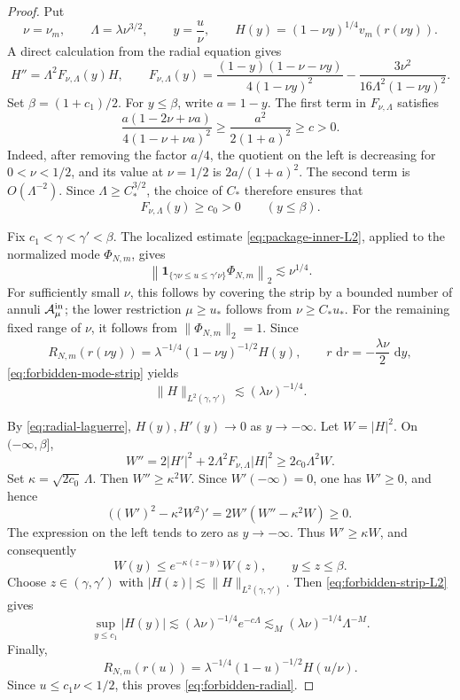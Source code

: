 \documentclass[11pt,a4paper]{amsart}
\numberwithin{equation}{section}
\newcommand{\one}{\mathbf 1}
\newcommand{\dd}{\,\mathrm d}
\newcommand{\norm}[1]{\lVert #1\rVert}
\begin{document}
\begin{proof}
Put
\[
 \nu=\nu_m,\qquad \Lambda=\lambda\nu^{3/2},\qquad y=\frac u\nu,
 \qquad H(y)=(1-\nu y)^{1/4}v_m(r(\nu y)).
\]
A direct calculation from the radial equation gives
\[
 H''=\Lambda^2F_{\nu,\Lambda}(y)H,
 \qquad
 F_{\nu,\Lambda}(y)
 =\frac{(1-y)(1-\nu-\nu y)}{4(1-\nu y)^2}
 -\frac{3\nu^2}{16\Lambda^2(1-\nu y)^2}.
\]
Set \(\beta=(1+c_1)/2\). For \(y\le\beta\), write \(a=1-y\). The first
term in \(F_{\nu,\Lambda}\) satisfies
\[
 \frac{a(1-2\nu+\nu a)}{4(1-\nu+\nu a)^2}
 \ge \frac{a^2}{2(1+a)^2}\ge c>0.
\]
Indeed, after removing the factor \(a/4\), the quotient on the left is
decreasing for \(0<\nu<1/2\), and its value at \(\nu=1/2\) is
\(2a/(1+a)^2\). The second term is \(O(\Lambda^{-2})\). Since
\(\Lambda\ge C_*^{3/2}\), the choice of \(C_*\) therefore ensures that
\begin{equation}\label{eq:forbidden-positivity}
 F_{\nu,\Lambda}(y)\ge c_0>0\qquad(y\le\beta).
\end{equation}

Fix \(c_1<\gamma<\gamma'<\beta\). The localized estimate
\eqref{eq:package-inner-L2}, applied to the normalized mode
\(\Phi_{N,m}\), gives
\begin{equation}\label{eq:forbidden-mode-strip}
 \left\|\one_{\{\gamma\nu\le u\le\gamma'\nu\}}\Phi_{N,m}\right\|_2
 \lesssim \nu^{1/4}.
\end{equation}
For sufficiently small \(\nu\), this follows by covering the strip by a
bounded number of annuli \(\mathcal A_\mu^{\rm in}\); the lower restriction
\(\mu\ge u_*\) follows from \(\nu\ge C_*u_*\). For the remaining fixed range
of \(\nu\), it follows from \(\|\Phi_{N,m}\|_2=1\). Since
\[
 R_{N,m}(r(\nu y))
 =\lambda^{-1/4}(1-\nu y)^{-1/2}H(y),
 \qquad r\,\dd r=-\frac{\lambda\nu}{2}\,\dd y,
\]
\eqref{eq:forbidden-mode-strip} yields
\begin{equation}\label{eq:forbidden-strip-L2}
 \norm H_{L^2(\gamma,\gamma')}
 \lesssim(\lambda\nu)^{-1/4}.
\end{equation}

By \eqref{eq:radial-laguerre}, \(H(y),H'(y)\to0\) as \(y\to-\infty\).
Let \(W=|H|^2\). On \(( -\infty,\beta]\),
\[
 W''=2|H'|^2+2\Lambda^2F_{\nu,\Lambda}|H|^2
 \ge2c_0\Lambda^2W.
\]
Set \(\kappa=\sqrt{2c_0}\,\Lambda\). Then \(W''\ge\kappa^2W\). Since
\(W'(-\infty)=0\), one has \(W'\ge0\), and hence
\[
 \bigl((W')^2-\kappa^2W^2\bigr)'
 =2W'(W''-\kappa^2W)\ge0.
\]
The expression on the left tends to zero as \(y\to-\infty\). Thus
\(W'\ge\kappa W\), and consequently
\[
 W(y)\le e^{-\kappa(z-y)}W(z),
 \qquad y\le z\le\beta.
\]
Choose \(z\in(\gamma,\gamma')\) with
\(|H(z)|\lesssim\norm H_{L^2(\gamma,\gamma')}\). Then
\eqref{eq:forbidden-strip-L2} gives
\[
 \sup_{y\le c_1}|H(y)|
 \lesssim(\lambda\nu)^{-1/4}e^{-c\Lambda}
 \lesssim_M(\lambda\nu)^{-1/4}\Lambda^{-M}.
\]
Finally,
\[
 R_{N,m}(r(u))
 =\lambda^{-1/4}(1-u)^{-1/2}H(u/\nu).
\]
Since \(u\le c_1\nu<1/2\), this proves \eqref{eq:forbidden-radial}.
\end{proof}
\end{document}
